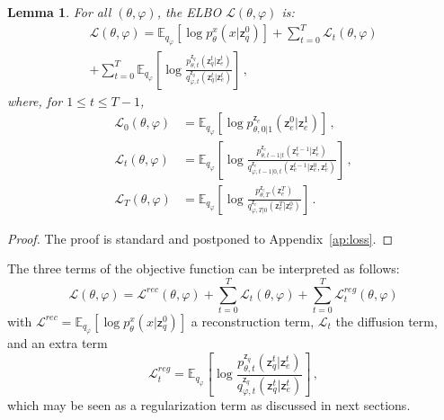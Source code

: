 \documentclass[nohyperref]{article}
\theoremstyle{plain}
\newtheorem{lemma}[theorem]{Lemma}
\theoremstyle{definition}
\theoremstyle{remark}
\newcommand{\latentcont}{\mathsf{z}_e}
\newcommand{\latentdis}{\mathsf{z}_q}
\newcommand{\embedspace}{\mathcal{E}}
\begin{document}
\begin{lemma}
\label{lem:loss}
For all $(\theta,\varphi)$, the ELBO $\mathcal{L}(\theta,\varphi)$ is:
\begin{multline*}
\mathcal{L}(\theta,\varphi) = \mathbb{E}_{q_{\varphi}}\left[\log p^x_{\theta}(x|\latentdis^{0})\right] + \sum_{t=0}^T \mathcal{L}_t(\theta,\varphi)\\
+ \sum_{t=0}^T\mathbb{E}_{q_{\varphi}}\left[\log \frac{p_{\theta,t}^{\latentdis}(\latentdis^{t}|\latentcont^{t})}{q_{\varphi,t}^{\latentdis}(\latentdis^{t}|\latentcont^{t})}\right]\,, 
\end{multline*}
where, for $1\leqslant t \leqslant T-1$,
\begin{align*}
\mathcal{L}_0(\theta,\varphi) &=  \mathbb{E}_{q_\varphi}\left[\log p^{\latentcont}_{\theta, 0|1}(\latentcont^0|\latentcont^{1})\right]\,,\\
\mathcal{L}_t(\theta,\varphi) &= \mathbb{E}_{q_{\varphi}}\left[\log \frac{p_{\theta,t-1|t}^{\latentcont}(\latentcont^{t-1}|\latentcont^{t})}{q^{\latentcont}_{\varphi,t-1|0,t}(\latentcont^{t-1}|\latentcont^{0},\latentcont^{t})}\right]\,,\\
    \mathcal{L}_T(\theta,\varphi) &= \mathbb{E}_{q_{\varphi}}\left[\log \frac{p^{\latentcont}_{\theta,T}(\latentcont^{T})}{q_{\varphi,T|0}^{\latentcont}(\latentcont^{T}|\latentcont^{0})}\right]\,.
\end{align*}
\end{lemma}
\begin{proof}
The proof is standard and postponed to Appendix~\ref{ap:loss}.
\end{proof}
The three terms of the objective function can be interpreted as follows:
$$
\mathcal{L}(\theta,\varphi) = \mathcal{L}^{rec}(\theta,\varphi) + \sum_{t=0}^T \mathcal{L}_t(\theta,\varphi) + \sum_{t=0}^T \mathcal{L}^{reg}_t(\theta,\varphi)
$$
with $\mathcal{L}^{rec} = \mathbb{E}_{q_{\varphi}}[\log p^x_{\theta}(x|\latentdis^{0})]$ a reconstruction term, $\mathcal{L}_t$ the diffusion term, and an extra term \begin{equation}
\mathcal{L}^{reg}_t = \mathbb{E}_{q_{\varphi}}\left[\log \frac{p_{\theta,t}^{\latentdis}(\latentdis^{t}|\latentcont^{t})}{q_{\varphi,t}^{\latentdis}(\latentdis^{t}|\latentcont^{t})}\right]\,,
\end{equation}
which may be seen as a regularization term as discussed in next sections.
\end{document}
